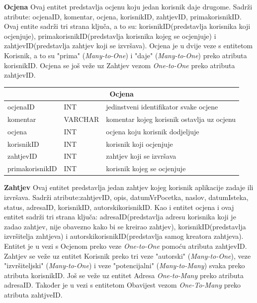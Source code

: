 			\bigskip
			\bigskip
			\textbf{Ocjena} Ovaj entitet predstavlja ocjenu koju jedan korisnik daje drugome. Sadrži atribute: ocjenaID, komentar, ocjena, korisnikID, zahtjevID, primakorisnikID. Ovaj entite sadrži tri strana ključa, a to su: korisnikID(predstavlja korisnika koji ocjenjuje), primakorisnikID(predstavlja korisnika kojeg se ocjenjuje) i zahtjevID(predstavlja zahtjev koji se izvršava). Ocjena je u  dvije veze s entitetom Korisnik, a to su "prima" (\textit{Many-to-One}) i "daje" (\textit{Many-to-One}) preko atributa korisnikID. Ocjena se još veže uz Zahtjev vezom \textit{One-to-One} preko atributa zahtjevID. 
			\bigskip
			
			\begin{tabularx} {\textwidth} {|p{3.5cm}|p{2cm}|X|}
				
				\hline
				\multicolumn{3}{|c|}{\textbf{Ocjena}} \\
				\hline
				
				\cellcolor{LightGreen}ocjenaID & INT	& jedinstveni identifikator svake ocjene	\\ \hline
				komentar	& VARCHAR &  komentar kojeg korisnik ostavlja uz ocjenu 	\\ \hline 
				ocjena & INT & ocjena koju korisnik dodjeljuje  \\ \hline 
				\cellcolor{LightBlue} korisnikID	& INT &  korisnik koji ocjenjuje 	\\ \hline 
				\cellcolor{LightBlue} zahtjevID	& INT &  zahtjev koji se izvršava 	\\ \hline 
				\cellcolor{LightBlue} primakorisnikID	& INT &  korisnik kojeg se ocjenjuje 	\\ \hline 
				
			\end{tabularx}
			
			\bigskip
			\bigskip
			\textbf{Zahtjev} Ovaj entitet predstavlja jedan zahtjev kojeg korisnik aplikacije zadaje ili izvršava. Sadrži atribute:zahtjevID, opis, datumVrPocetka, naslov, datumIsteka, status, adresaID, korisnikID, autorskikorisnikID. Kao i entitet ocjena i ovaj entitet sadrži tri strana ključa: adresaID(predstavlja adresu korisnika koji je zadao zahtjev, nije obavezno kako bi se kreirao zahtjev), korisnikID(predstavlja izvršitelja zahtjeva) i autorskikorisnikID(predstavlja samog kreatora zahtjeva). Entitet je u vezi s Ocjenom preko veze \textit{One-to-One} pomoću atributa zahtjevID. Zahtjev se veže uz entitet Korisnik preko tri veze "autorski" (\textit{Many-to-One}), veze "izvršiteljski" (\textit{Many-to-One}) i veze "potencijalni" (\textit{Many-to-Many}) svaka preko atributa korisnikID. Još se veže uz entitet Adresa \textit{One-to-Many} preko atributa adresaID. Također je u vezi s entitetom Obavijest vezom \textit{One-To-Many} preko atributa zahtjveID. 
			\bigskip
			
